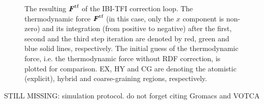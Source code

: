 \documentclass[aps,pre,preprint,unsortedaddress]{revtex4}
\newcommand{\redc}[1]{{\color{red} #1}}
\renewcommand{\v}[1]{\textbf{\textit{#1}}}
\begin{document}
\begin{figure}
  \caption{The resulting $\v F^{\textrm{tf}}$ of the IBI-TFI
    correction loop.  The thermodynamic force $\v F^{\textrm{tf}}$ (in
    this case, only the $x$ component is non-zero) and its
    integration (from positive to negative) after the first, second
    and the third step iteration are denoted by red, green and blue
    solid lines, respectively. The initial guess of the thermodynamic
    force, i.e. the thermodynamic force without RDF correction, is
    plotted for comparison. EX, HY and CG are denoting the atomistic
    (explicit), hybrid and coarse-graining regions, respectively.}
  \label{fig:tmp6}
\end{figure}


\redc{STILL MISSING: simulation protocol. do not forget citing Gromacs and VOTCA}


{}

\end{document}
